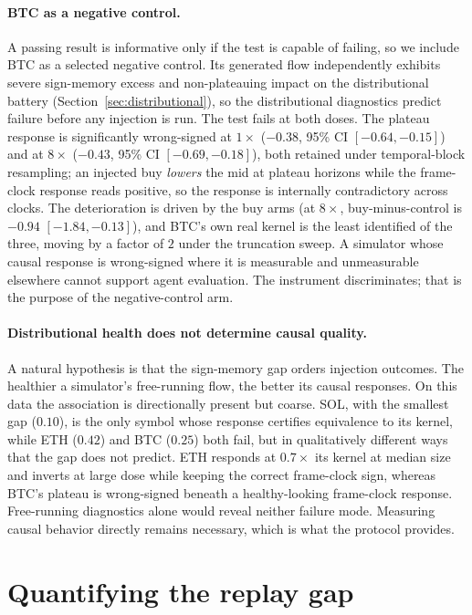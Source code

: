 \documentclass[11pt]{article}
\begin{document}
\paragraph{BTC as a negative control.} A passing result is informative only if the test is capable of failing, so we include BTC as a selected negative control. Its generated flow independently exhibits severe sign-memory excess and non-plateauing impact on the distributional battery (Section~\ref{sec:distributional}), so the distributional diagnostics predict failure before any injection is run. The test fails at both doses. The plateau response is significantly wrong-signed at $1\times$ ($-0.38$, 95\% CI $[-0.64, -0.15]$) and at $8\times$ ($-0.43$, 95\% CI $[-0.69, -0.18]$), both retained under temporal-block resampling; an injected buy \emph{lowers} the mid at plateau horizons while the frame-clock response reads positive, so the response is internally contradictory across clocks. The deterioration is driven by the buy arms (at $8\times$, buy-minus-control is $-0.94$ $[-1.84, -0.13]$), and BTC's own real kernel is the least identified of the three, moving by a factor of $2$ under the truncation sweep. A simulator whose causal response is wrong-signed where it is measurable and unmeasurable elsewhere cannot support agent evaluation. The instrument discriminates; that is the purpose of the negative-control arm.

\paragraph{Distributional health does not determine causal quality.} A natural hypothesis is that the sign-memory gap orders injection outcomes. The healthier a simulator's free-running flow, the better its causal responses. On this data the association is directionally present but coarse. SOL, with the smallest gap ($0.10$), is the only symbol whose response certifies equivalence to its kernel, while ETH ($0.42$) and BTC ($0.25$) both fail, but in qualitatively different ways that the gap does not predict. ETH responds at $0.7\times$ its kernel at median size and inverts at large dose while keeping the correct frame-clock sign, whereas BTC's plateau is wrong-signed beneath a healthy-looking frame-clock response. Free-running diagnostics alone would reveal neither failure mode. Measuring causal behavior directly remains necessary, which is what the protocol provides.

\section{Quantifying the replay gap}
\label{sec:replaygap}
\end{document}

